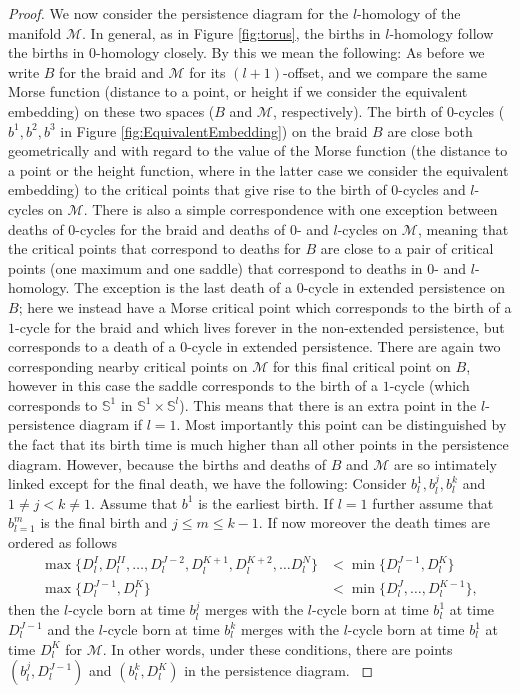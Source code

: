 \documentclass[twoside,leqno]{article}
\newcommand{\M}{\mathcal{M}}
\begin{document}
\begin{proof}
{We now consider the persistence diagram for the $l$-homology %
of the manifold $\M$.  
In general, as in Figure \ref{fig:torus}, the births in $l$-homology follow the births in $0$-homology closely. By this we mean the following: As before we write $B$ for the braid and $\M$ for its $(l+1)$-offset, and we compare the same Morse function (distance to a point, or height if we consider the equivalent embedding) on these two spaces ($B$ and $\M$, respectively). 
The birth of $0$-cycles ($b^1,b^2,b^3$ in Figure \ref{fig:EquivalentEmbedding}) on the braid $B$ are close both geometrically and with regard to the value of the Morse function (the distance to a point or the height function, where in the latter case we consider the equivalent embedding) to the critical points that give rise to the birth of $0$-cycles and $l$-cycles on $\M$.  
There is also a simple correspondence with one exception between deaths of $0$-cycles for the braid and deaths of $0$- and $l$-cycles on $\M$, meaning that the critical points that correspond to deaths for $B$ are close to a pair of critical points (one maximum and one saddle) that correspond to deaths in $0$- and $l$-homology.  
The exception is the last death of a $0$-cycle in extended persistence on $B$; here we instead have a Morse critical point which corresponds to the birth of a $1$-cycle for the braid and which lives forever in the non-extended persistence, but corresponds to a death of a $0$-cycle in extended persistence. There are again two corresponding nearby critical points on $\M$ for this final critical point on $B$, however in this case the saddle corresponds to the birth of a $1$-cycle (which corresponds to $\mathbb{S}^1$ in $\mathbb{S}^1 \times \mathbb{S}^l$). This means that there is an extra point in the $l$-persistence diagram if $l=1$. Most importantly this point can be distinguished by the fact that its birth time is much higher than all other points in the persistence diagram.  
However, because the births and deaths of $B$ and $\M$ are so intimately linked except for the final death, we have the following: 
Consider $b^1_l, b^j_l,b^k_l$ and  $1 \neq j < k \neq 1$. Assume that $b^1$ is the earliest birth. If $l =1$ further assume that $b^m_{l=1}$ is the final birth and $j \leq m \leq k-1 $.
If now moreover the death times are ordered as follows
\begin{align} 
\max \{D^{I}_l, D^{II}_l, \dots, D^{J-2}_l, D^{K+1}_l, D^{K+2}_l , \dots D^N_l\}  &< \min \{ D^{J-1}_l,  D^{K}_l\} 
\nonumber
\\ 
 \max \{ D^{J-1}_l ,D^{K}_l \} &< \min\{ D^{J}_l, \dots  , D^{K-1}_l\} ,
\label{eq:DeathConditionsHl}
\end{align} 
then the $l$-cycle born at time $b^j_l$ merges with the $l$-cycle  born at time $b^1_l$ at time $D^{J-1}_l$ and the $l$-cycle born at time $b^k_l$ merges with the $l$-cycle  born at time $b^1_l$ at time $D^{K}_l$ for $\M$. 
In other words, under these conditions, there are points $(b^j_l,D^{J-1}_l)$ and $(b^k_l , D^K_l)$ in the persistence diagram. 
%
}



\end{proof}
\end{document}
